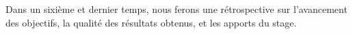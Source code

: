Dans un sixième et dernier temps, nous ferons une rétrospective sur l'avancement des objectifs, la qualité des résultats obtenus, et les apports du stage.






